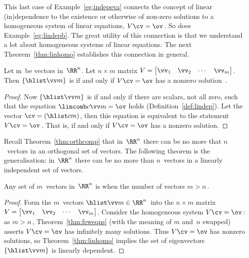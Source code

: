 This last case of Example~\ref{eg:indepeva} connects the concept of linear (in)dependence to the existence or otherwise of non-zero solutions to a homogeneous system of linear equations, \(V\cv=\ov\)\,.
So does Example~\ref{eg:lindepb}.
The great utility of this connection is that we understand a lot about homogeneous systems of linear equations.
The next Theorem~\ref{thm:linhomo} establishes this connection in general.


\begin{theorem} \label{thm:linhomo} 
Let \hlist\vv m\ be vectors in~\(\RR^n\).  
Let \(n\times m\) matrix \(V=\begin{bmatrix} \vv_1&\vv_2&\cdots&\vv_m \end{bmatrix}\).  
Then \(\{\hlist\vv m\}\) is  if and only if \(V\cv=\ov\) has a nonzero solution~\cv.
\end{theorem}
\begin{proof} 
Now \(\{\hlist\vv m\}\) is  if and only if there are scalars, not all zero, such that the equation \(\lincomb c\vv m=\ov\) holds (Definition~\ref{def:lindep}).
Let the vector \(\cv=(\hlist cm)\), then this equation is equivalent to the statement \(V\cv=\ov\)\,.
That is, if and only if \(V\cv=\ov\) has a nonzero solution.
\end{proof}





Recall Theorem~\ref{thm:orthcomp} that in~\(\RR^n\) there can be no more that \(n\)~vectors in an orthogonal set of vectors.
The following theorem is the generalisation: in~\(\RR^n\) there can be no more than \(n\)~vectors in a linearly independent set of vectors.

\begin{theorem} \label{thm:mgtnli} 
Any set of \(m\)~vectors in~\(\RR^n\) is  when the number of vectors \(m>n\)\,.
\end{theorem}
\begin{proof} 
Form the \(m\)~vectors \(\hlist\vv m\in\RR^n\)\ into the \(n\times m\) matrix \(V=\begin{bmatrix} \vv_1&\vv_2&\cdots&\vv_m \end{bmatrix}\).
Consider the homogeneous system \(V\cv=\ov\)\,: 
as \(m>n\)\,, Theorem~\ref{thm:feweqns} (with the meaning of \(m\) and~\(n\) swapped) asserts \(V\cv=\ov\) has infinitely many solutions.
Thus \(V\cv=\ov\) has nonzero solutions, so Theorem~\ref{thm:linhomo} implies the set of eigenvectors \(\{\hlist\vv m\}\) is linearly dependent.
\end{proof}



